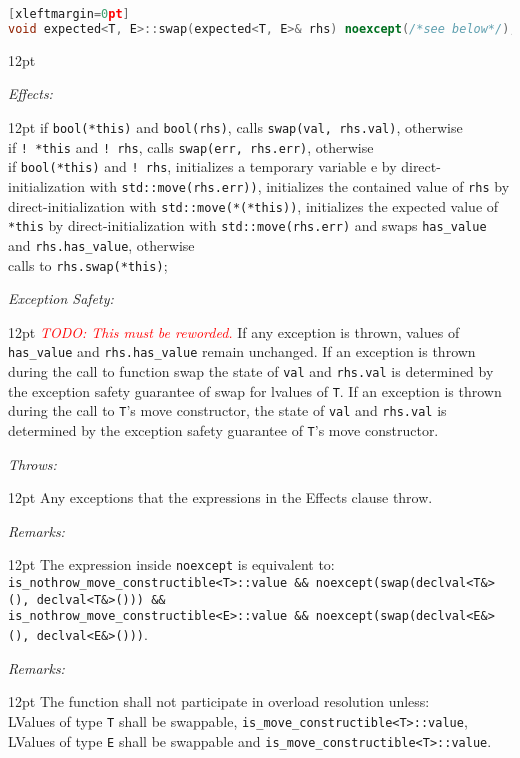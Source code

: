 \documentclass[a4paper,10pt]{article}
\newcommand{\cpp}[1]{\lstinline{#1}}
\newcommand{\todo}[1]{\emph{\textcolor{red}{TODO: #1}}}
\newcommand{\wordingItem}[1]{\noindent\textit{#1:}}
\newenvironment{wordingTextItem}[1]{\wordingItem{#1}\vspace{2pt}\noindent\begin{adjustwidth}{12pt}{}}{\vspace{2pt}\end{adjustwidth}}
\newenvironment{wordingPara}{\begin{adjustwidth}{12pt}{}}{\end{adjustwidth}}
\begin{document}
\begin{lstlisting}[language=C++][xleftmargin=0pt]
void expected<T, E>::swap(expected<T, E>& rhs) noexcept(/*see below*/); 
\end{lstlisting}
\begin{wordingPara}

\begin{wordingTextItem}{Effects}
if \cpp{bool(*this)} and \cpp{bool(rhs)}, calls \cpp{swap(val, rhs.val)}, otherwise \\
if \cpp{! *this} and \cpp{! rhs}, calls \cpp{swap(err, rhs.err)}, otherwise \\
if \cpp{bool(*this)} and \cpp{! rhs}, initializes a temporary variable e by direct-initialization with \cpp{std::move(rhs.err))}, initializes the contained value of \cpp{rhs} by direct-initialization with \cpp{std::move(*(*this))}, initializes the expected value of \cpp{*this} by direct-initialization with \cpp{std::move(rhs.err)} and swaps \cpp{has_value} and \cpp{rhs.has_value}, otherwise \\
calls to \cpp{rhs.swap(*this)};
\end{wordingTextItem}
\begin{wordingTextItem}{Exception Safety}
\todo{This must be reworded.}
If any exception is thrown, values of \cpp{has_value} and \cpp{rhs.has_value} remain unchanged. If an exception is thrown during the call to function swap the state of \cpp{val} and \cpp{rhs.val} is determined by the exception safety guarantee of swap for lvalues of \cpp{T}. If an exception is thrown during the call to \cpp{T}'s move constructor, the state of \cpp{val} and \cpp{rhs.val} is determined by the exception safety guarantee of \cpp{T}'s move constructor.
\end{wordingTextItem}
\begin{wordingTextItem}{Throws}
Any exceptions that the expressions in the Effects clause throw.
\end{wordingTextItem}
\begin{wordingTextItem}{Remarks}
The expression inside \cpp{noexcept} is equivalent to: \\
\cpp{is_nothrow_move_constructible<T>::value && noexcept(swap(declval<T&>(), declval<T&>())) &&} \\
\cpp{is_nothrow_move_constructible<E>::value && noexcept(swap(declval<E&>(), declval<E&>()))}.
\end{wordingTextItem}
\begin{wordingTextItem}{Remarks}
The function shall not participate in overload resolution unless: \\
LValues of type \cpp{T} shall be swappable, \cpp{is_move_constructible<T>::value}, LValues of type \cpp{E} shall be swappable and \cpp{is_move_constructible<T>::value}.
\end{wordingTextItem}
\end{wordingPara}
\end{document}
